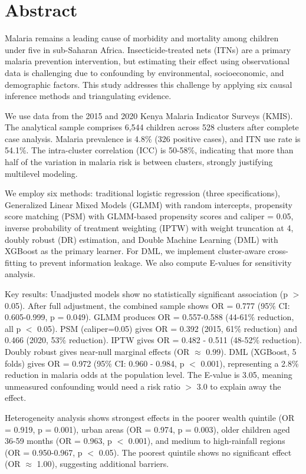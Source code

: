 \chapter*{Abstract}

Malaria remains a leading cause of morbidity and mortality among children under five in sub-Saharan Africa. Insecticide-treated nets (ITNs) are a primary malaria prevention intervention, but estimating their effect using observational data is challenging due to confounding by environmental, socioeconomic, and demographic factors. This study addresses this challenge by applying six causal inference methods and triangulating evidence.

We use data from the 2015 and 2020 Kenya Malaria Indicator Surveys (KMIS). The analytical sample comprises 6,544 children across 528 clusters after complete case analysis. Malaria prevalence is 4.8\% (326 positive cases), and ITN use rate is 54.1\%. The intra-cluster correlation (ICC) is 50-58\%, indicating that more than half of the variation in malaria risk is between clusters, strongly justifying multilevel modeling.

We employ six methods: traditional logistic regression (three specifications), Generalized Linear Mixed Models (GLMM) with random intercepts, propensity score matching (PSM) with GLMM-based propensity scores and caliper = 0.05, inverse probability of treatment weighting (IPTW) with weight truncation at 4, doubly robust (DR) estimation, and Double Machine Learning (DML) with XGBoost as the primary learner. For DML, we implement cluster-aware cross-fitting to prevent information leakage. We also compute E-values for sensitivity analysis.

Key results: Unadjusted models show no statistically significant association (p $>$ 0.05). After full adjustment, the combined sample shows OR = 0.777 (95$\%$ CI: 0.605-0.999, p = 0.049). GLMM produces OR = 0.557-0.588 (44-61$\%$ reduction, all p $<$ 0.05). PSM (caliper=0.05) gives OR = 0.392 (2015, 61\% reduction) and 0.466 (2020, 53$\%$ reduction). IPTW gives OR = 0.482 - 0.511 (48-52$\%$ reduction). Doubly robust gives near-null marginal effects (OR $\approx$ 0.99). DML (XGBoost, 5 folds) gives OR = 0.972 (95\% CI: 0.960 - 0.984, p $<$ 0.001), representing a 2.8\% reduction in malaria odds at the population level. The E-value is 3.05, meaning unmeasured confounding would need a risk ratio $>$ 3.0 to explain away the effect.

Heterogeneity analysis shows strongest effects in the poorer wealth quintile (OR = 0.919, p = 0.001), urban areas (OR = 0.974, p = 0.003), older children aged 36-59 months (OR = 0.963, p $<$ 0.001), and medium to high-rainfall regions (OR = 0.950-0.967, p $<$ 0.05). The poorest quintile shows no significant effect (OR $\approx$ 1.00), suggesting additional barriers.

